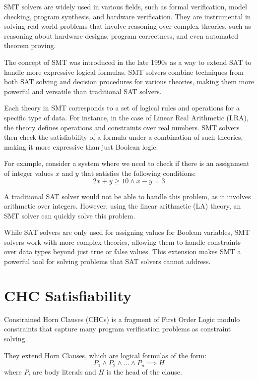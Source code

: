 SMT solvers are widely used in various fields, such as formal verification, model checking, program synthesis, and hardware verification. They are instrumental in solving real-world problems that involve reasoning over complex theories, such as reasoning about hardware designs, program correctness, and even automated theorem proving.

The concept of SMT was introduced in the late 1990s as a way to extend SAT to handle more expressive logical formulas. SMT solvers combine techniques from both SAT solving and decision procedures for various theories, making them more powerful and versatile than traditional SAT solvers.

Each theory in SMT corresponds to a set of logical rules and operations for a specific type of data. For instance, in the case of Linear Real Arithmetic (LRA), the theory defines operations and constraints over real numbers. SMT solvers then check the satisfiability of a formula under a combination of such theories, making it more expressive than just Boolean logic.

For example, consider a system where we need to check if there is an assignment of integer values $x$ and $y$ that satisfies the following conditions:
\begin{equation*}
    2x + y \geq 10 \land x - y = 3
\end{equation*}

A traditional SAT solver would not be able to handle this problem, as it involves arithmetic over integers. However, using the linear arithmetic (LA) theory, an SMT solver can quickly solve this problem.

While SAT solvers are only used for assigning values for Boolean variables, SMT solvers work with more complex theories, allowing them to handle constraints over data types beyond just true or false values. This extension makes SMT a powerful tool for solving problems that SAT solvers cannot address.

\section{CHC Satisfiability}
\noindent Constrained Horn Clauses (CHCs) is a fragment of First Order Logic
modulo constraints that capture many program verification problems as
constraint solving.

\vspace{\baselineskip}\noindent
They extend Horn Clauses, which are logical formulas of the form:
\begin{equation*}
    P_{1} \land P_{2} \land \dots \land P_{n} \implies H
\end{equation*}
where $P_i$ are body literals and $H$ is the head of the clause.

